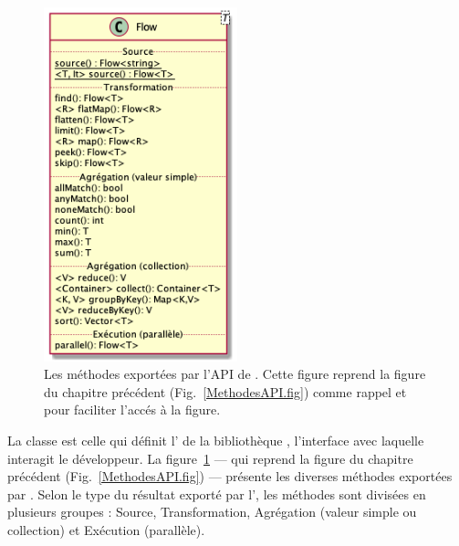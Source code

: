 \begin{figure}
\centering
     \includegraphics[width=0.5\textwidth]{Figures/flow-details.png}
      \caption[Les m\'ethodes export\'ees par l'API de .]{Les m\'ethodes export\'ees par l'API de . Cette figure reprend la figure du chapitre pr\'ec\'edent (Fig.~\ref{MethodesAPI.fig}) comme rappel et pour faciliter l'acc\'es \`a la figure.}
       \label{Flow.fig}
\end{figure}



La classe  est celle qui définit l' de la biblioth\`eque , l'interface avec laquelle interagit le d\'eveloppeur. La figure~\ref{Flow.fig} --- qui reprend la figure du chapitre pr\'ec\'edent (Fig.~\ref{MethodesAPI.fig}) --- pr\'esente les diverses m\'ethodes export\'ees par . Selon le type du résultat export\'e par l', les m\'ethodes sont divis\'ees en plusieurs groupes : Source, Transformation, Agr\'egation (valeur simple ou collection) et Ex\'ecution (parallèle).

